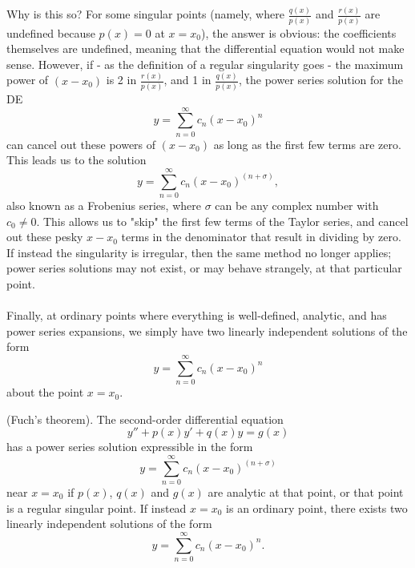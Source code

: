 \documentclass{article}
\begin{document}
Why is this so? For some singular points (namely, where $\frac{q(x)}{p(x)}$ and $\frac{r(x)}{p(x)}$ are undefined because $p(x)=0$ at $x=x_0$), the answer is obvious: the coefficients themselves are undefined, meaning that the differential equation would not make sense. However, if - as the definition of a regular singularity goes - the maximum power of $(x-x_0)$ is 2 in $\frac{r(x)}{p(x)}$, and 1 in $\frac{q(x)}{p(x)}$, the power series solution for the DE 
\begin{equation*}
    y=\sum_{n=0}^{\infty} c_n (x-x_0)^n
\end{equation*}
    can cancel out these powers of $(x-x_0)$ as long as the first few terms are zero. This leads us to the solution
\begin{equation*}
        y=\sum_{n=0}^{\infty} c_n (x-x_0)^{(n+\sigma)},
\end{equation*}
also known as a Frobenius series, where $\sigma$ can be any complex number with $c_0 \neq 0$. This allows us to "skip" the first few terms of the Taylor series, and cancel out these pesky $x-x_0$ terms in the denominator that result in dividing by zero. If instead the singularity is irregular, then the same method no longer applies; power series solutions may not exist, or may behave strangely, at that particular point. \\ \\
Finally, at ordinary points where everything is well-defined, analytic, and has power series expansions, we simply have two linearly independent solutions of the form 
\begin{equation*}
    y=\sum_{n=0}^{\infty} c_n(x-x_0)^n
\end{equation*}
about the point $x=x_0$. 
\begin{theorem}
    (Fuch's theorem). The second-order differential equation 
    \begin{equation*}
        y''+p(x)y'+q(x)y=g(x)
    \end{equation*}
    has a power series solution expressible in the form
    \begin{equation*}
        y=\sum_{n=0}^{\infty} c_n (x-x_0)^{(n+\sigma)}
\end{equation*}
    near $x=x_0$ if $p(x)$, $q(x)$ and $g(x)$ are analytic at that point, or that point is a regular singular point. If instead $x=x_0$ is an ordinary point, there exists two linearly independent solutions of the form 
    \begin{equation*}
        y=\sum_{n=0}^{\infty} c_n(x-x_0)^n.
    \end{equation*}
\end{theorem}
\end{document}
